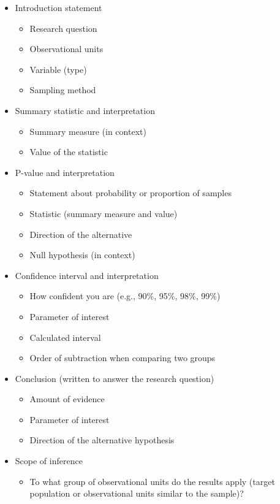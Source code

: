 \documentclass[
]{report}
\providecommand{\tightlist}{%
  \setlength{\itemsep}{0pt}\setlength{\parskip}{0pt}}
\begin{document}
\begin{itemize}
\item
  Introduction statement

  \begin{itemize}
  \item
    Research question
  \item
    Observational units
  \item
    Variable (type)
  \item
    Sampling method
  \end{itemize}
\item
  Summary statistic and interpretation

  \begin{itemize}
  \item
    Summary measure (in context)
  \item
    Value of the statistic
  \end{itemize}
\item
  P-value and interpretation

  \begin{itemize}
  \item
    Statement about probability or proportion of samples
  \item
    Statistic (summary measure and value)
  \item
    Direction of the alternative
  \item
    Null hypothesis (in context)
  \end{itemize}
\item
  Confidence interval and interpretation

  \begin{itemize}
  \item
    How confident you are (e.g., 90\%, 95\%, 98\%, 99\%)
  \item
    Parameter of interest
  \item
    Calculated interval
  \item
    Order of subtraction when comparing two groups
  \end{itemize}
\item
  Conclusion (written to answer the research question)

  \begin{itemize}
  \item
    Amount of evidence
  \item
    Parameter of interest
  \item
    Direction of the alternative hypothesis
  \end{itemize}
\item
  Scope of inference

  \begin{itemize}
  \tightlist
  \item
    To what group of observational units do the results apply (target population or observational units similar to the sample)?
  \end{itemize}
\end{itemize}
\end{document}
